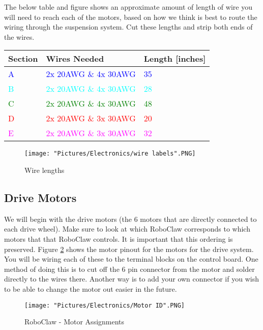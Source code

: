 \documentclass{article}
\begin{document}
\noindent The below table and figure shows an approximate amount of length of wire you will need to reach each of the motors, based on how we think is best to route the wiring through the suspension system. Cut these lengths and strip both ends of the wires. 


\begin{tabular}[3] {| p{2cm} | p{7cm} | p{4cm} |}
	\hline
	\textbf{Section} & \textbf{Wires Needed} & \textbf{Length [inches]}  \\ \hline
	\textcolor{blue}{A} & \textcolor{blue}{2x 20AWG \& 4x 30AWG} & \textcolor{blue}{35} \\ \hline
	\textcolor{cyan}{B} & \textcolor{cyan}{2x 20AWG \& 4x 30AWG} & \textcolor{cyan}{28} \\ \hline
	\textcolor{green}{C} & \textcolor{green}{2x 20AWG \& 4x 30AWG} & \textcolor{green}{48} \\ \hline
	\textcolor{red}{D} & \textcolor{red}{2x 20AWG \& 3x 30AWG} & \textcolor{red}{20} \\ \hline
	\textcolor{magenta}{E} & \textcolor{magenta}{2x 20AWG \& 3x 30AWG} & \textcolor{magenta}{32} \\ \hline
\end{tabular}

\begin{figure}[H]
 	\centering
	\texttt{[image: "Pictures/Electronics/wire labels".PNG]}
 	\caption{Wire lengths}
	\label{wire lengths}
\end{figure}

\subsection{Drive Motors}
We will begin with the drive motors (the 6 motors that are directly connected to each drive wheel). Make sure to look at which RoboClaw corresponds to which motors that that RoboClaw controls. It is important that this ordering is preserved. Figure \ref{motorID} shows the motor pinout for the motors for the drive system. You will be wiring each of these to the terminal blocks on the control board. One method of doing this is to cut off the 6 pin connector from the motor and solder directly to the wires there. Another way is to add your own connector if you wish to be able to change the motor out easier in the future.

\begin{figure}[H]
 	\centering
	\texttt{[image: "Pictures/Electronics/Motor ID".PNG]}
 	\caption{RoboClaw - Motor Assignments}
	\label{motorID}
\end{figure}
\end{document}
